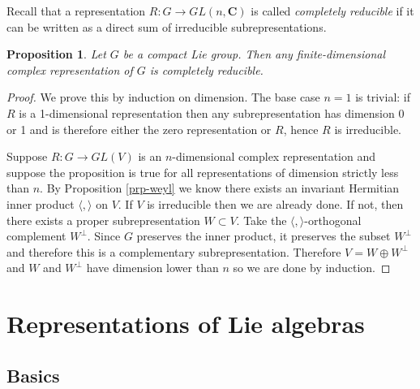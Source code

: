\documentclass[12pt]{article}
\newcommand{\CC}{\mathbf{C}}
\newtheorem{prp}[thm]{Proposition}
\theoremstyle{definition}
\theoremstyle{check}
\theoremstyle{remark}
\theoremstyle{TheoremNum}
\begin{document}
Recall that a representation $R\colon G\to GL(n,\CC)$ is called {\em completely reducible} if it can be written as a direct sum of irreducible subrepresentations.
\begin{prp}
Let $G$ be a compact Lie group. Then any finite-dimensional complex representation of $G$ is completely reducible.
\end{prp}
\begin{proof}
We prove this by induction on dimension. The base case $n=1$ is trivial: if $R$ is a 1-dimensional representation then any subrepresentation has dimension 0 or 1 and is therefore either the zero representation or $R$, hence $R$ is irreducible.

Suppose $R\colon G\to GL(V)$ is an $n$-dimensional complex representation and suppose the proposition is true for all representations of dimension strictly less than $n$. By Proposition \ref{prp-weyl} we know there exists an invariant Hermitian inner product $\langle,\rangle$ on $V$. If $V$ is irreducible then we are already done. If not, then there exists a proper subrepresentation $W\subset V$. Take the $\langle,\rangle$-orthogonal complement $W^{\perp}$. Since $G$ preserves the inner product, it preserves the subset $W^{\perp}$ and therefore this is a complementary subrepresentation. Therefore $V=W\oplus W^{\perp}$ and $W$ and $W^{\perp}$ have dimension lower than $n$ so we are done by induction.
\end{proof}

\section{Representations of Lie algebras}

\subsection{Basics}
\end{document}
